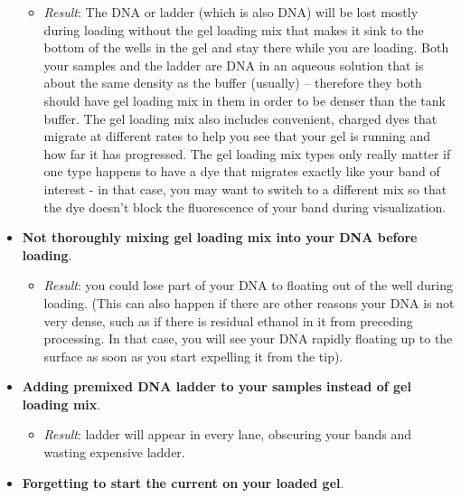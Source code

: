 \documentclass[
  letterpaper,
  DIV=11,
  numbers=noendperiod]{scrreprt}
\providecommand{\tightlist}{%
  \setlength{\itemsep}{0pt}\setlength{\parskip}{0pt}}\usepackage{longtable,booktabs,array}
\begin{document}
\begin{itemize}
  \begin{itemize}
  \tightlist
  \item
    \emph{Result}: The DNA or ladder (which is also DNA) will be lost
    mostly during loading without the gel loading mix that makes it sink
    to the bottom of the wells in the gel and stay there while you are
    loading. Both your samples and the ladder are DNA in an aqueous
    solution that is about the same density as the buffer (usually) --
    therefore they both should have gel loading mix in them in order to
    be denser than the tank buffer. The gel loading mix also includes
    convenient, charged dyes that migrate at different rates to help you
    see that your gel is running and how far it has progressed. The gel
    loading mix types only really matter if one type happens to have a
    dye that migrates exactly like your band of interest - in that case,
    you may want to switch to a different mix so that the dye doesn't
    block the fluorescence of your band during visualization.
  \end{itemize}
\item
  \textbf{Not thoroughly mixing gel loading mix into your DNA before
  loading}.

  \begin{itemize}
  \tightlist
  \item
    \emph{Result}: you could lose part of your DNA to floating out of
    the well during loading. (This can also happen if there are other
    reasons your DNA is not very dense, such as if there is residual
    ethanol in it from preceding processing. In that case, you will see
    your DNA rapidly floating up to the surface as soon as you start
    expelling it from the tip).
  \end{itemize}
\item
  \textbf{Adding premixed DNA ladder to your samples instead of gel
  loading mix}.

  \begin{itemize}
  \tightlist
  \item
    \emph{Result}: ladder will appear in every lane, obscuring your
    bands and wasting expensive ladder.
  \end{itemize}
\item
  \textbf{Forgetting to start the current on your loaded gel}.


\end{itemize}
\end{document}
